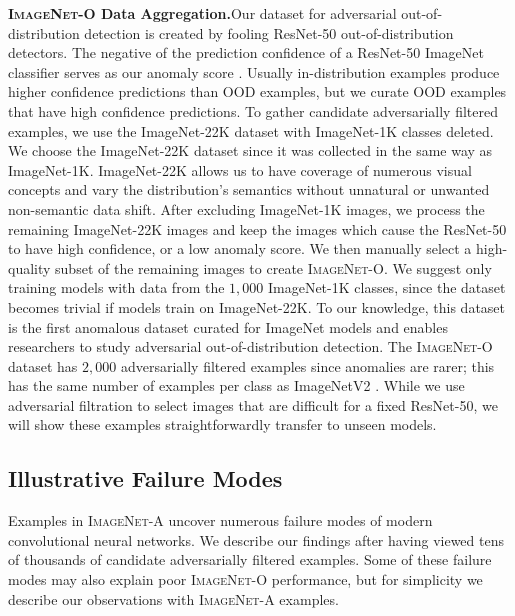 \documentclass[10pt,twocolumn,letterpaper]{article}
\begin{document}
\noindent\textbf{\textsc{ImageNet-O} Data Aggregation.}\quad Our dataset for adversarial out-of-distribution detection is created by fooling ResNet-50 out-of-distribution detectors. The negative of the prediction confidence of a ResNet-50 ImageNet classifier serves as our anomaly score \cite{hendrycks17baseline}. Usually in-distribution examples produce higher confidence predictions than OOD examples, but we curate OOD examples that have high confidence predictions. To gather candidate adversarially filtered examples, we use the ImageNet-22K dataset with ImageNet-1K classes deleted. We choose the ImageNet-22K dataset since it was collected in the same way as ImageNet-1K. ImageNet-22K allows us to have coverage of numerous visual concepts and vary the distribution's semantics without unnatural or unwanted non-semantic data shift. After excluding ImageNet-1K images, we process the remaining ImageNet-22K images and keep the images which cause the ResNet-50 to have high confidence, or a low anomaly score. We then manually select a high-quality subset of the remaining images to create \textsc{ImageNet-O}. We suggest only training models with data from the $1,000$ ImageNet-1K classes, since the dataset becomes trivial if models train on ImageNet-22K. To our knowledge, this dataset is the first anomalous dataset curated for ImageNet models and enables researchers to study adversarial out-of-distribution detection. The \textsc{ImageNet-O} dataset has $2,000$ adversarially filtered examples since anomalies are rarer; this has the same number of examples per class as ImageNetV2 \cite{Recht2019DoIC}. While we use adversarial filtration to select images that are difficult for a fixed ResNet-50, we will show these examples straightforwardly transfer to unseen models. 


\subsection{Illustrative Failure Modes}\label{sec:failures}

Examples in \textsc{ImageNet-A} uncover numerous failure modes of modern convolutional neural networks. We describe our findings after having viewed tens of thousands of candidate adversarially filtered examples. Some of these failure modes may also explain poor \textsc{ImageNet-O} performance, but for simplicity we describe our observations with \textsc{ImageNet-A} examples.
\end{document}
